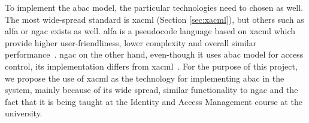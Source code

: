 To implement the \acrshort{abac} model, the particular technologies need to chosen as well. The most wide-spread standard is \acrshort{xacml} (Section \ref{sec:xacml}), but others such as \acrfull{alfa} or \acrfull{ngac} exists as well. \acrshort{alfa} is a pseudocode language based on \acrshort{xacml} which provide higher user-friendliness, lower complexity and overall similar performance~\cite{Mejri2016FormalPolicies}. \acrshort{ngac} on the other hand, even-though it uses \acrshort{abac} model for access control, its implementation differs from \acrshort{xacml}~\cite{Ferraiolo2016ANGAC}. For the purpose of this project, we propose the use of \acrshort{xacml} as the technology for implementing \acrshort{abac} in the system, mainly because of its wide spread, similar functionality to \acrshort{ngac} and the fact that it is being taught at the Identity and Access Management course at the university.

